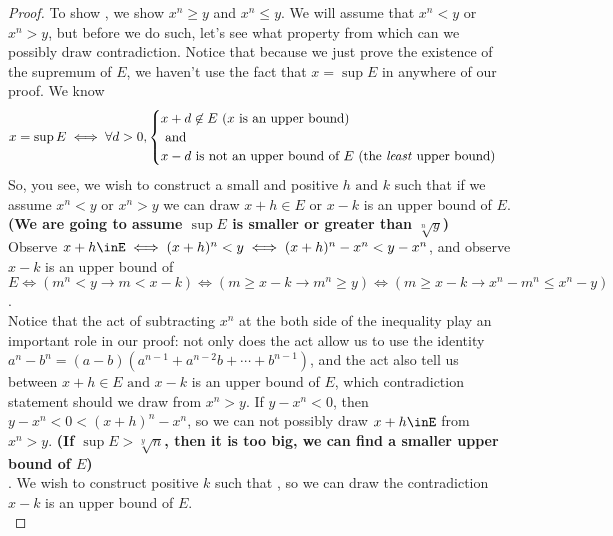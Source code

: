 \documentclass{report}
\begin{document}
\begin{proof}
To show , we show $x^n\geq y$ and $x^n\leq y$. We will assume that $x^n<y$ or $x^n>y$, but before we do such, let's see what property from which can we possibly draw contradiction. Notice that because we just prove the existence of the supremum of $E$, we haven't use the fact that $x=\sup E$ in anywhere of our proof. We know
\begin{equation*}
x=\sup E\iff \forall d>0,
\begin{cases}
x+d\not\in E\text{ ($x$ is an upper bound) }\\
\text{ and }\\
x-d \text{ is not an upper bound of $E$ (the \emph{least} upper bound)}
\end{cases}    
\end{equation*}
So, you see, we wish to construct  a small and positive $h\text{ and }k$ such that if we assume $x^n<y\text{ or }x^n>y$ we can draw $x+h\in E$ or $x-k$ is an upper bound of $E$. \textbf{(We are going to assume $\sup E$ is smaller or greater than $\sqrt[n]{y}$)} \\

Observe $x+h\inE\iff (x+h)^n<y\iff (x+h)^n-x^n<y-x^n$, and observe $x-k$ is an upper bound of $E\iff (m^n<y\longrightarrow m<x-k)\iff (m\geq x-k\longrightarrow m^n\geq y)\iff (m\geq x-k\longrightarrow x^n-m^n\leq x^n-y)$.\\

Notice that the act of  subtracting  $x^n$ at the both side of the inequality play an important role in our proof: not only does the act allow us to use the identity $a^n-b^n=(a-b)(a^{n-1}+a^{n-2}b+\cdots +b^{n-1})$, and the act also tell us between $x+h \in E\text{ and }x-k$ is an upper bound of $E$, which contradiction statement should we draw from $x^n>y$. If $y-x^n<0$, then  $y-x^n<0<(x+h)^n-x^n$, so we can not possibly draw $x+h\inE$ from $x^n>y$. \textbf{(If $\sup E>\sqrt[y]{n}$, then it is too big, we can find a smaller upper bound of $E$)}\\

. We wish to construct positive $k$ such that , so we can draw the contradiction $x-k$ is an upper bound of $E$. \\ 


\end{proof}
\end{document}
